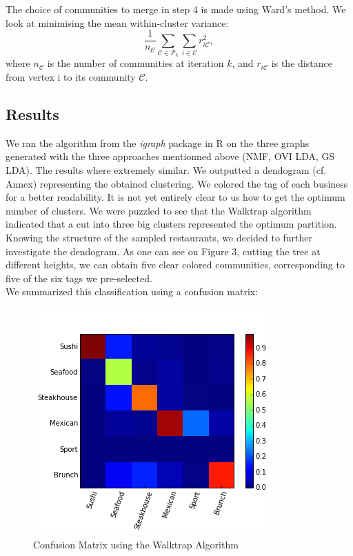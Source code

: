 \documentclass[twoside]{article}
\begin{document}
\begin{multicols}{2}
\noindent The choice of communities to merge in step 4 is made using Ward's method. We look at minimising the mean within-cluster variance:
$$\frac{1}{n_\mathcal{C}}\sum\limits_{\mathcal{C}\in\mathcal{P}_{k}}\sum\limits_{i\in\mathcal{C}}r^2_{i\mathcal{C}},$$
\noindent where $n_\mathcal{C}$ is the number of communities at iteration $k$, and $r_{i\mathcal{C}}$ is the distance from vertex i to its community $\mathcal{C}$.\\

\subsection{Results}

We ran the algorithm from the \emph{igraph} \cite{igr} package in R on the three graphs generated with the three approaches mentionned above (NMF, OVI LDA, GS LDA). The results where extremely similar. We outputted a dendogram (cf. Annex) representing the obtained clustering. We colored the tag of each business for a better readability.  It is not yet entirely clear to us how to get the optimum number of clusters. We were puzzled to see that the Walktrap algorithm indicated that a cut into three big clusters represented the optimum partition. Knowing the structure of the sampled restaurants, we decided to further investigate the dendogram. As one can see on Figure 3, cutting the tree at different heights, we can obtain five clear colored communities, corresponding to five of the six tags we pre-selected.\\

\noindent We summarized this classification using a confusion matrix: 
\begin{figure}[H]
\centering
\includegraphics[width=1\linewidth]{img/confusion}
\caption{Confusion Matrix using the Walktrap Algorithm}
\end{figure}


\end{multicols}
\end{document}

